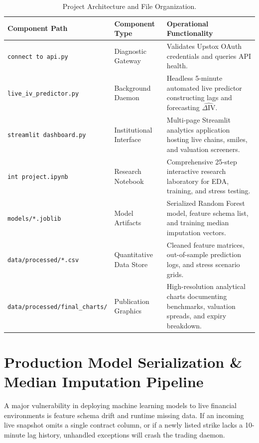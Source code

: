 \begin{table}[H]
    \centering
    \scriptsize
    \renewcommand{\arraystretch}{0.90}
    \caption{Project Architecture and File Organization.}
    \label{tab:codebase_structure}
    \begin{tabularx}{\textwidth}{lp{3.5cm}X}
        \toprule
        \textbf{Component Path} & \textbf{Component Type} & \textbf{Operational Functionality} \\
        \midrule
        \texttt{connect to api.py} & Diagnostic Gateway & Validates Upstox OAuth credentials and queries API health. \\
        \texttt{live\_iv\_predictor.py} & Background Daemon & Headless 5-minute automated live predictor constructing lags and forecasting $\widehat{\Delta \text{IV}}$. \\
        \texttt{streamlit dashboard.py} & Institutional Interface & Multi-page Streamlit analytics application hosting live chains, smiles, and valuation screeners. \\
        \texttt{int project.ipynb} & Research Notebook & Comprehensive 25-step interactive research laboratory for EDA, training, and stress testing. \\
        \texttt{models/*.joblib} & Model Artifacts & Serialized Random Forest model, feature schema list, and training median imputation vectors. \\
        \texttt{data/processed/*.csv} & Quantitative Data Store & Cleaned feature matrices, out-of-sample prediction logs, and stress scenario grids. \\
        \texttt{data/processed/final\_charts/} & Publication Graphics & High-resolution analytical charts documenting benchmarks, valuation spreads, and expiry breakdown. \\
        \bottomrule
    \end{tabularx}
\end{table}

\section{Production Model Serialization \& Median Imputation Pipeline}
\label{sec:model_serialization}

A major vulnerability in deploying machine learning models to live financial environments is feature schema drift and runtime missing data. If an incoming live snapshot omits a single contract column, or if a newly listed strike lacks a 10-minute lag history, unhandled exceptions will crash the trading daemon.

